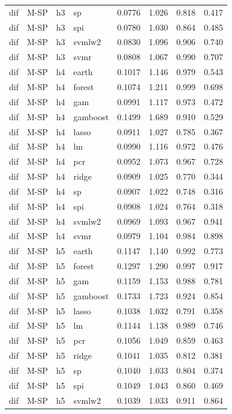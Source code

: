 \begin{ThreePartTable}
\begin{longtable}[t]{llclcccc}
dif & M-SP & h3 & sp & 0.0776 & 1.026 & 0.818 & 0.417\\
dif & M-SP & h3 & spi & 0.0780 & 1.030 & 0.864 & 0.485\\
dif & M-SP & h3 & svmlw2 & 0.0830 & 1.096 & 0.906 & 0.740\\
dif & M-SP & h3 & svmr & 0.0808 & 1.067 & 0.990 & 0.707\\
\addlinespace
dif & M-SP & h4 & earth & 0.1017 & 1.146 & 0.979 & 0.543\\
dif & M-SP & h4 & forest & 0.1074 & 1.211 & 0.999 & 0.698\\
dif & M-SP & h4 & gam & 0.0991 & 1.117 & 0.973 & 0.472\\
dif & M-SP & h4 & gamboost & 0.1499 & 1.689 & 0.910 & 0.529\\
dif & M-SP & h4 & lasso & 0.0911 & 1.027 & 0.785 & 0.367\\
dif & M-SP & h4 & lm & 0.0990 & 1.116 & 0.972 & 0.476\\
dif & M-SP & h4 & pcr & 0.0952 & 1.073 & 0.967 & 0.728\\
dif & M-SP & h4 & ridge & 0.0909 & 1.025 & 0.770 & 0.344\\
dif & M-SP & h4 & sp & 0.0907 & 1.022 & 0.748 & 0.316\\
dif & M-SP & h4 & spi & 0.0908 & 1.024 & 0.764 & 0.318\\
dif & M-SP & h4 & svmlw2 & 0.0969 & 1.093 & 0.967 & 0.941\\
dif & M-SP & h4 & svmr & 0.0979 & 1.104 & 0.984 & 0.898\\
\addlinespace
dif & M-SP & h5 & earth & 0.1147 & 1.140 & 0.992 & 0.773\\
dif & M-SP & h5 & forest & 0.1297 & 1.290 & 0.997 & 0.917\\
dif & M-SP & h5 & gam & 0.1159 & 1.153 & 0.988 & 0.781\\
dif & M-SP & h5 & gamboost & 0.1733 & 1.723 & 0.924 & 0.854\\
dif & M-SP & h5 & lasso & 0.1038 & 1.032 & 0.791 & 0.358\\
dif & M-SP & h5 & lm & 0.1144 & 1.138 & 0.989 & 0.746\\
dif & M-SP & h5 & pcr & 0.1056 & 1.049 & 0.859 & 0.463\\
dif & M-SP & h5 & ridge & 0.1041 & 1.035 & 0.812 & 0.381\\
dif & M-SP & h5 & sp & 0.1040 & 1.033 & 0.804 & 0.374\\
dif & M-SP & h5 & spi & 0.1049 & 1.043 & 0.860 & 0.469\\
dif & M-SP & h5 & svmlw2 & 0.1039 & 1.033 & 0.911 & 0.864\\

\end{longtable}
\end{ThreePartTable}
